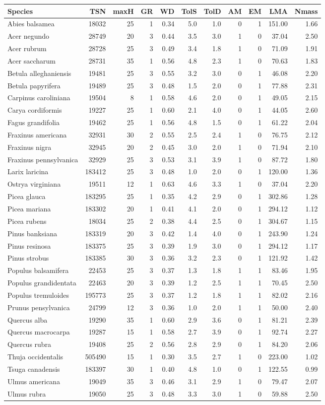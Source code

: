 \begin{longtable}[]{@{}lrrrrrrrrrr@{}}
\toprule
Species & TSN & maxH & GR & WD & TolS & TolD & AM & EM & LMA &
Nmass\tabularnewline
\midrule
\endhead
Abies balsamea & 18032 & 25 & 1 & 0.34 & 5.0 & 1.0 & 0 & 1 & 151.00 &
1.66\tabularnewline
Acer negundo & 28749 & 20 & 3 & 0.44 & 3.5 & 3.0 & 1 & 0 & 37.04 &
2.50\tabularnewline
Acer rubrum & 28728 & 25 & 3 & 0.49 & 3.4 & 1.8 & 1 & 0 & 71.09 &
1.91\tabularnewline
Acer saccharum & 28731 & 35 & 1 & 0.56 & 4.8 & 2.3 & 1 & 0 & 70.63 &
1.83\tabularnewline
Betula alleghaniensis & 19481 & 25 & 3 & 0.55 & 3.2 & 3.0 & 0 & 1 &
46.08 & 2.20\tabularnewline
Betula papyrifera & 19489 & 25 & 3 & 0.48 & 1.5 & 2.0 & 0 & 1 & 77.88 &
2.31\tabularnewline
Carpinus caroliniana & 19504 & 8 & 1 & 0.58 & 4.6 & 2.0 & 0 & 1 & 49.05
& 2.15\tabularnewline
Carya cordiformis & 19227 & 25 & 1 & 0.60 & 2.1 & 4.0 & 0 & 1 & 44.05 &
2.60\tabularnewline
Fagus grandifolia & 19462 & 25 & 1 & 0.56 & 4.8 & 1.5 & 0 & 1 & 61.22 &
2.04\tabularnewline
Fraxinus americana & 32931 & 30 & 2 & 0.55 & 2.5 & 2.4 & 1 & 0 & 76.75 &
2.12\tabularnewline
Fraxinus nigra & 32945 & 20 & 2 & 0.45 & 3.0 & 2.0 & 1 & 0 & 71.94 &
2.10\tabularnewline
Fraxinus pennsylvanica & 32929 & 25 & 3 & 0.53 & 3.1 & 3.9 & 1 & 0 &
87.72 & 1.80\tabularnewline
Larix laricina & 183412 & 25 & 3 & 0.48 & 1.0 & 2.0 & 0 & 1 & 120.00 &
1.36\tabularnewline
Ostrya virginiana & 19511 & 12 & 1 & 0.63 & 4.6 & 3.3 & 1 & 0 & 37.04 &
2.20\tabularnewline
Picea glauca & 183295 & 25 & 1 & 0.35 & 4.2 & 2.9 & 0 & 1 & 302.86 &
1.28\tabularnewline
Picea mariana & 183302 & 20 & 1 & 0.41 & 4.1 & 2.0 & 0 & 1 & 294.12 &
1.12\tabularnewline
Picea rubens & 18034 & 25 & 2 & 0.38 & 4.4 & 2.5 & 0 & 1 & 304.67 &
1.15\tabularnewline
Pinus banksiana & 183319 & 20 & 3 & 0.42 & 1.4 & 4.0 & 0 & 1 & 243.90 &
1.24\tabularnewline
Pinus resinosa & 183375 & 25 & 3 & 0.39 & 1.9 & 3.0 & 0 & 1 & 294.12 &
1.17\tabularnewline
Pinus strobus & 183385 & 30 & 3 & 0.36 & 3.2 & 2.3 & 0 & 1 & 121.92 &
1.42\tabularnewline
Populus balsamifera & 22453 & 25 & 3 & 0.37 & 1.3 & 1.8 & 1 & 1 & 83.46
& 1.95\tabularnewline
Populus grandidentata & 22463 & 20 & 3 & 0.39 & 1.2 & 2.5 & 1 & 1 &
70.45 & 2.50\tabularnewline
Populus tremuloides & 195773 & 25 & 3 & 0.37 & 1.2 & 1.8 & 1 & 1 & 82.02
& 2.16\tabularnewline
Prunus pensylvanica & 24799 & 12 & 3 & 0.36 & 1.0 & 2.0 & 1 & 1 & 50.00
& 2.40\tabularnewline
Quercus alba & 19290 & 35 & 1 & 0.60 & 2.9 & 3.6 & 0 & 1 & 81.21 &
2.39\tabularnewline
Quercus macrocarpa & 19287 & 15 & 1 & 0.58 & 2.7 & 3.9 & 0 & 1 & 92.74 &
2.27\tabularnewline
Quercus rubra & 19408 & 25 & 2 & 0.56 & 2.8 & 2.9 & 0 & 1 & 84.20 &
2.06\tabularnewline
Thuja occidentalis & 505490 & 15 & 1 & 0.30 & 3.5 & 2.7 & 1 & 0 & 223.00
& 1.02\tabularnewline
Tsuga canadensis & 183397 & 30 & 1 & 0.40 & 4.8 & 1.0 & 0 & 1 & 122.55 &
0.99\tabularnewline
Ulmus americana & 19049 & 35 & 3 & 0.46 & 3.1 & 2.9 & 1 & 0 & 79.47 &
2.07\tabularnewline
Ulmus rubra & 19050 & 25 & 3 & 0.48 & 3.3 & 3.0 & 1 & 0 & 59.88 &
2.50\tabularnewline
\bottomrule
\end{longtable}

